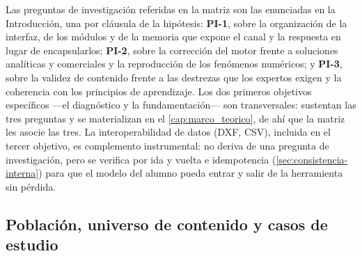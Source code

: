 Las preguntas de investigación referidas en la matriz son las enunciadas en la Introducción, una por cláusula de la hipótesis: \textbf{PI-1}, sobre la organización de la interfaz, de los módulos y de la memoria que expone el canal y la respuesta en lugar de encapsularlos; \textbf{PI-2}, sobre la corrección del motor frente a soluciones analíticas y comerciales y la reproducción de los fenómenos numéricos; y \textbf{PI-3}, sobre la validez de contenido frente a las destrezas que los expertos exigen y la coherencia con los principios de aprendizaje. Los dos primeros objetivos específicos —el diagnóstico y la fundamentación— son transversales: sustentan las tres preguntas y se materializan en el \autoref{cap:marco_teorico}, de ahí que la matriz les asocie las tres. La interoperabilidad de datos (DXF, CSV), incluida en el tercer objetivo, es complemento instrumental: no deriva de una pregunta de investigación, pero se verifica por ida y vuelta e idempotencia (\autoref{sec:consistencia-interna}) para que el modelo del alumno pueda entrar y salir de la herramienta sin pérdida.

\subsection{Población, universo de contenido y casos de estudio}
\label{sec:poblacion}

